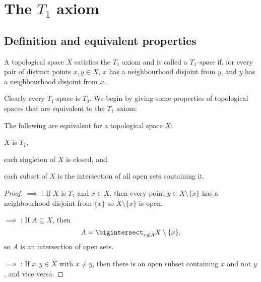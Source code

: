 \documentclass[article, a4paper, 11pt, oneside]{memoir}
\numberwithin{equation}{chapter}
\begin{document}
\chapter[The T1 axiom][The $T_1$ axiom]{The $T_1$ axiom}

\section{Definition and equivalent properties}

\begin{definition}
    A topological space $X$ satisfies the $T_1$ axiom and is called a \emph{$T_1$-space} if, for every pair of distinct points $x,y \in X$, $x$ has a neighbourhood disjoint from $y$, and $y$ has a neighbourhood disjoint from $x$.
\end{definition}
%
Clearly every $T_1$-space is $T_0$. We begin by giving some properties of topological spaces that are equivalent to the $T_1$ axiom:

\begin{proposition}
    The following are equivalent for a topological space $X$:
    \begin{enumprop}
        \item \label{enum:T1-space} $X$ is $T_1$,
        \item \label{enum:T1-singletons-closed} each singleton of $X$ is closed, and
        \item \label{enum:T1-intersection-of-open-sets} each subset of $X$ is the intersection of all open sets containing it.
    \end{enumprop}
\end{proposition}

\begin{proof}
     $\implies$ : If $X$ is $T_1$ and $x \in X$, then every point $y \in X \setminus \{x\}$ has a neighbourhood disjoint from $\{x\}$ so $X \setminus \{x\}$ is open.

     $\implies$ : If $A \subseteq X$, then
    \begin{equation*}
        A = \bigintersect_{x \not\in A} X \setminus \{x\},
    \end{equation*}
    so $A$ is an intersection of open sets.

     $\implies$ : If $x,y \in X$ with $x \neq y$, then there is an open subset containing $x$ and not $y$, and vice versa.
\end{proof}
\end{document}
